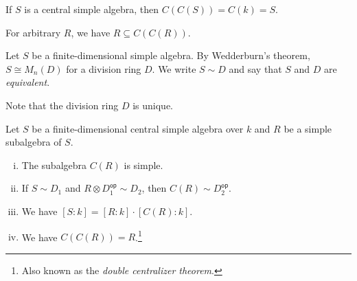 \begin{opomba}
If $S$ is a central simple algebra, then $C(C(S)) = C(k) = S$.
\end{opomba}

\begin{opomba}
For arbitrary $R$, we have $R \subseteq C(C(R))$.
\end{opomba}

\begin{definicija}
Let $S$ be a finite-dimensional simple algebra. By Wedderburn's
theorem, $S \cong M_n(D)$ for a division ring $D$. We write
$S \sim D$ and say that $S$ and $D$ are \emph{equivalent}.
\end{definicija}

\begin{opomba}
Note that the division ring $D$ is unique.
\end{opomba}

\begin{izrek}[Centralizer]
Let $S$ be a finite-dimensional central simple algebra over $k$ and
$R$ be a simple subalgebra of $S$.

\begin{enumerate}[i)]
\item The subalgebra $C(R)$ is simple.
\item If $S \sim D_1$ and $R \otimes D_1^{\mathsf{op}} \sim D_2$,
then $C(R) \sim D_2^{\mathsf{op}}$.
\item We have $[S : k] = [R : k] \cdot [C(R) : k]$.
\item We have $C(C(R)) = R$.\footnote{Also known as the
\emph{double centralizer theorem}.}
\end{enumerate}
\end{izrek}

